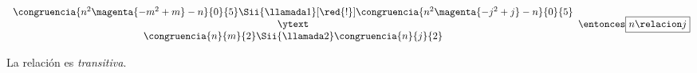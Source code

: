 \begin{enumerate}[label=\alph*)]
        $$
          \begin{array}{c}
            \congruencia{n^2 \magenta{- m^2 + m} - n}{0}{5}
                  \Sii{\llamada1}[\red{!}]
            \congruencia{n^2 \magenta{- j^2 + j} - n}{0}{5}
                  \\
            \ytext                                          \\
            \congruencia{n}{m}{2}
            \Sii{\llamada2}
            \congruencia{n}{j}{2}
          \end{array}
          \entonces
          \boxed{
            n \relacion j}
        $$\par
        La relación es \textit{transitiva}.
\end{enumerate}
